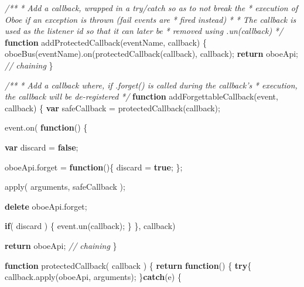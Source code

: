 \documentclass[12pt, ]{article}
\newenvironment{Shaded}{}{}
\newcommand{\KeywordTok}[1]{\textcolor[rgb]{0.00,0.44,0.13}{\textbf{{#1}}}}
\newcommand{\CommentTok}[1]{\textcolor[rgb]{0.38,0.63,0.69}{\textit{{#1}}}}
\newcommand{\OtherTok}[1]{\textcolor[rgb]{0.00,0.44,0.13}{{#1}}}
\newcommand{\FunctionTok}[1]{\textcolor[rgb]{0.02,0.16,0.49}{{#1}}}
\newcommand{\NormalTok}[1]{{#1}}
\begin{document}
\begin{Shaded}
\begin{Highlighting}[]
   \CommentTok{/** }
\CommentTok{    * Add a callback, wrapped in a try/catch so as to not break the}
\CommentTok{    * execution of Oboe if an exception is thrown (fail events are }
\CommentTok{    * fired instead)}
\CommentTok{    * }
\CommentTok{    * The callback is used as the listener id so that it can later be}
\CommentTok{    * removed using .un(callback)}
\CommentTok{    */}
   \KeywordTok{function} \FunctionTok{addProtectedCallback}\NormalTok{(eventName, callback) \{}
      \FunctionTok{oboeBus}\NormalTok{(eventName).}\FunctionTok{on}\NormalTok{(}\FunctionTok{protectedCallback}\NormalTok{(callback), callback);}
      \KeywordTok{return} \NormalTok{oboeApi; }\CommentTok{// chaining            }
   \NormalTok{\}}

   \CommentTok{/**}
\CommentTok{    * Add a callback where, if .forget() is called during the callback's}
\CommentTok{    * execution, the callback will be de-registered}
\CommentTok{    */}
   \KeywordTok{function} \FunctionTok{addForgettableCallback}\NormalTok{(event, callback) \{}
      \KeywordTok{var} \NormalTok{safeCallback = }\FunctionTok{protectedCallback}\NormalTok{(callback);}
   
      \OtherTok{event}\NormalTok{.}\FunctionTok{on}\NormalTok{( }\KeywordTok{function}\NormalTok{() \{}
      
         \KeywordTok{var} \NormalTok{discard = }\KeywordTok{false}\NormalTok{;}
             
         \OtherTok{oboeApi}\NormalTok{.}\FunctionTok{forget} \NormalTok{= }\KeywordTok{function}\NormalTok{()\{}
            \NormalTok{discard = }\KeywordTok{true}\NormalTok{;}
         \NormalTok{\};           }
         
         \FunctionTok{apply}\NormalTok{( arguments, safeCallback );         }
               
         \KeywordTok{delete} \OtherTok{oboeApi}\NormalTok{.}\FunctionTok{forget}\NormalTok{;}
         
         \KeywordTok{if}\NormalTok{( discard ) \{          }
            \OtherTok{event}\NormalTok{.}\FunctionTok{un}\NormalTok{(callback);}
         \NormalTok{\}}
      \NormalTok{\}, callback)}
      
      \KeywordTok{return} \NormalTok{oboeApi; }\CommentTok{// chaining         }
   \NormalTok{\}  }
         
   \KeywordTok{function} \FunctionTok{protectedCallback}\NormalTok{( callback ) \{}
      \KeywordTok{return} \KeywordTok{function}\NormalTok{() \{}
         \KeywordTok{try}\NormalTok{\{      }
            \OtherTok{callback}\NormalTok{.}\FunctionTok{apply}\NormalTok{(oboeApi, arguments);   }
         \NormalTok{\}}\KeywordTok{catch}\NormalTok{(e)  \{}
         

\end{Highlighting}
\end{Shaded}
\end{document}
